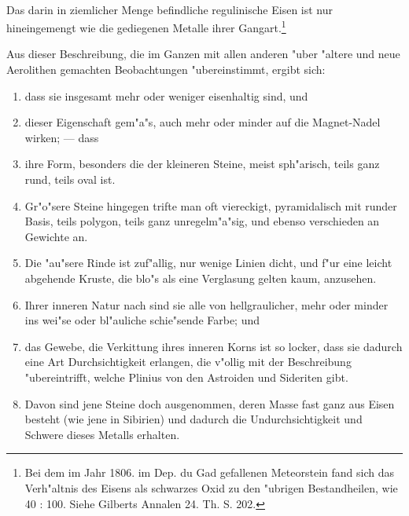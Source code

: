 \documentclass[a4paper, 11pt, oneside, polutonikogreek, german]{article}
\begin{document}
\paragraph{}
Das darin in ziemlicher Menge befindliche regulinische Eisen ist nur hineingemengt wie die gediegenen Metalle ihrer Gangart.\footnote{Bei dem im Jahr 1806. im Dep. du Gad gefallenen Meteorstein fand sich das Verh"altnis des Eisens als schwarzes Oxid zu den "ubrigen Bestandheilen, wie 40 : 100. Siehe Gilberts Annalen 24. Th. S. 202.}

Aus dieser Beschreibung, die im Ganzen mit allen anderen "uber "altere und neue Aerolithen gemachten Beobachtungen "ubereinstimmt, ergibt sich:
\begin{enumerate}
    \item dass sie insgesamt mehr oder weniger eisenhaltig sind, und
    \item dieser Eigenschaft gem"a"s, auch mehr oder minder auf die Magnet-Nadel wirken; --- dass
    \item ihre Form, besonders die der kleineren Steine, meist sph"arisch, teils ganz rund, teils oval ist.
    \item Gr"o"sere Steine hingegen trifte man oft viereckigt, pyramidalisch mit runder Basis, teils polygon, teils ganz unregelm"a"sig, und ebenso verschieden an Gewichte an.
    \item Die "au"sere Rinde ist zuf"allig, nur wenige Linien dicht, und f"ur eine leicht abgehende Kruste, die blo"s als eine Verglasung gelten kaum, anzusehen.
    \item Ihrer inneren Natur nach sind sie alle von hellgraulicher, mehr oder minder ins wei"se oder bl"auliche schie"sende Farbe; und
    \item das Gewebe, die Verkittung ihres inneren Korns ist so locker, dass sie dadurch eine Art Durchsichtigkeit erlangen, die v"ollig mit der Beschreibung "ubereintrifft, welche Plinius von den Astroiden und Sideriten gibt.
    \item Davon sind jene Steine doch ausgenommen, deren Masse fast ganz aus Eisen besteht (wie jene in Sibirien) und dadurch die Undurchsichtigkeit und Schwere dieses Metalls erhalten.
\end{enumerate}
\end{document}
